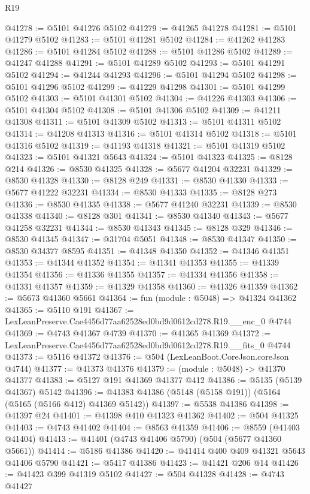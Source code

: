 \begin{lexlean}{R19}
\begin{coremodule}
{{{{{{{{{{{@41278 := @5101 @41276 @5102
@41279 := @41265 @41278
@41281 := @5101 @41279 @5102
@41283 := @5101 @41281 @5102
@41284 := @41262 @41283
@41286 := @5101 @41284 @5102
@41288 := @5101 @41286 @5102
@41289 := @41247 @41288
@41291 := @5101 @41289 @5102
@41293 := @5101 @41291 @5102
@41294 := @41244 @41293
@41296 := @5101 @41294 @5102
@41298 := @5101 @41296 @5102
@41299 := @41229 @41298
@41301 := @5101 @41299 @5102
@41303 := @5101 @41301 @5102
@41304 := @41226 @41303
@41306 := @5101 @41304 @5102
@41308 := @5101 @41306 @5102
@41309 := @41211 @41308
@41311 := @5101 @41309 @5102
@41313 := @5101 @41311 @5102
@41314 := @41208 @41313
@41316 := @5101 @41314 @5102
@41318 := @5101 @41316 @5102
@41319 := @41193 @41318
@41321 := @5101 @41319 @5102
@41323 := @5101 @41321 @5643
@41324 := @5101 @41323
@41325 := @8128 @214
@41326 := @8530 @41325
@41328 := @5677 @41204 @32231
@41329 := @8530 @41328
@41330 := @8128 @249
@41331 := @8530 @41330
@41333 := @5677 @41222 @32231
@41334 := @8530 @41333
@41335 := @8128 @273
@41336 := @8530 @41335
@41338 := @5677 @41240 @32231
@41339 := @8530 @41338
@41340 := @8128 @301
@41341 := @8530 @41340
@41343 := @5677 @41258 @32231
@41344 := @8530 @41343
@41345 := @8128 @329
@41346 := @8530 @41345
@41347 := @31704 @5051
@41348 := @8530 @41347
@41350 := @8530 @34377 @8595
@41351 := @41348 @41350
@41352 := @41346 @41351
@41353 := @41344 @41352
@41354 := @41341 @41353
@41355 := @41339 @41354
@41356 := @41336 @41355
@41357 := @41334 @41356
@41358 := @41331 @41357
@41359 := @41329 @41358
@41360 := @41326 @41359
@41362 := @5673 @41360 @5661
@41364 := fun (module : @5048) => @41324 @41362
@41365 := @5110 @191
@41367 := LexLeanPreserve.Cae4456d77aa62528ed0bd9d0612cd278.R19.__enc_0 @4744
@41369 := @4743 @41367 @4739
@41370 := @41365 @41369
@41372 := LexLeanPreserve.Cae4456d77aa62528ed0bd9d0612cd278.R19.__fits_0 @4744
@41373 := @5116 @41372
@41376 := @504 (LexLeanBoot.CoreJson.coreJson @4744)
@41377 := @41373 @41376
@41379 := (module : @5048) -> @41370 @41377
@41383 := @5127 @191 @41369 @41377 @412
@41386 := @5135 (@5139 @41367) @5142
@41396 := @41383 @41386 (@5148 (@5158 @191)) (@5164 (@5165 (@5166 @412) @41369 @5142))
@41397 := @5538 @41386
@41398 := @41397 @24
@41401 := @41398 @410 @41323 @41362
@41402 := @504 @41325
@41403 := @4743 @41402
@41404 := @8563 @41359
@41406 := @8559 (@41403 @41404)
@41413 := @41401 (@4743 @41406 @5790) (@504 (@5677 @41360 @5661))
@41414 := @5186 @41386
@41420 := @41414 @400 @409 @41321 @5643 @41406 @5790
@41421 := @5417 @41386
@41423 := @41421 @206 @14
@41426 := @41423 @399 @41319 @5102
@41427 := @504 @41328
@41428 := @4743 @41427
}}}}}}}}}}}
\end{coremodule}
\end{lexlean}
